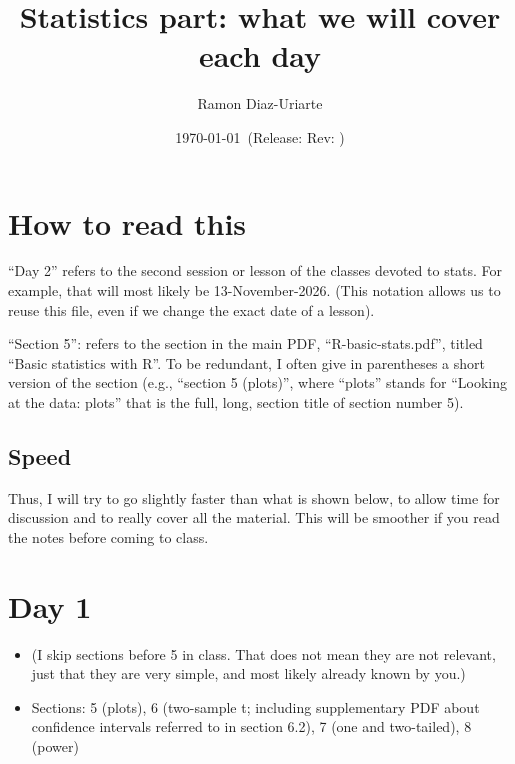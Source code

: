 \documentclass[12pt]{article}
\author{Ramon Diaz-Uriarte}
\date{\today}
\title{Statistics part: what we will cover each day}
\date{\gitAuthorDate\ {\footnotesize (Release\gitRels: Rev: \gitAbbrevHash)}}
\begin{document}
\maketitle
\section*{How to read this}
``Day 2'' refers to the second session or lesson of the classes devoted to stats. For example, that will most likely be 13-November-2026. (This notation allows us to reuse this file, even if we change the exact date of a lesson).


``Section 5'': refers to the section in the main PDF, ``R-basic-stats.pdf'', titled ``Basic statistics with R''. To be redundant, I often give in parentheses a short version of the section (e.g., ``section 5 (plots)'', where ``plots'' stands for ``Looking at the data: plots'' that is the full, long, section title of section number 5).

\subsection*{Speed}
\label{sec:speed}

Thus, I will try to go slightly faster than what is shown below, to allow time for discussion and to really cover all the material. This will be smoother if you read the notes before coming to class.


\section*{Day 1}
\label{sec:org21b08e0}
\begin{itemize}
  \item (I skip sections before 5 in class. That does not mean they are not relevant, just that they are very simple, and most likely already known by you.)
\item Sections: 5 (plots), 6 (two-sample t; including supplementary PDF about confidence intervals referred to in section 6.2), 7 (one and two-tailed), 8 (power)

\end{itemize}
\end{document}
